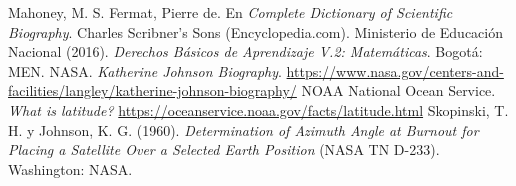 \documentclass[11pt]{article}
\begin{document}
\begin{referencias}
 Mahoney, M. S. Fermat, Pierre de. En \emph{Complete
  Dictionary of Scientific Biography}. Charles Scribner's Sons (Encyclopedia.com).
 Ministerio de Educación Nacional (2016). \emph{Derechos
  Básicos de Aprendizaje V.2: Matemáticas}. Bogotá: MEN.
 NASA. \emph{Katherine Johnson Biography}.
  \url{https://www.nasa.gov/centers-and-facilities/langley/katherine-johnson-biography/}
 NOAA National Ocean Service. \emph{What is latitude?}
  \url{https://oceanservice.noaa.gov/facts/latitude.html}
 Skopinski, T. H. y Johnson, K. G. (1960).
  \emph{Determination of Azimuth Angle at Burnout for Placing a Satellite Over
  a Selected Earth Position} (NASA TN D-233). Washington: NASA.
\end{referencias}
\end{document}
